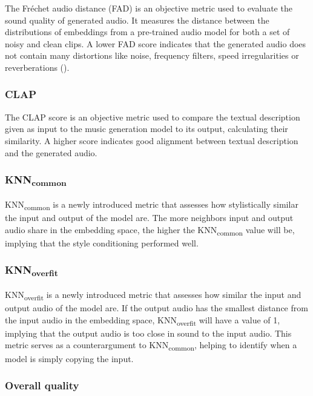 \documentclass[a4paper,12pt,twoside]{article}
\begin{document}
The Fréchet audio distance (FAD) is an objective metric used to evaluate the sound quality of generated audio. It measures the distance between the distributions of embeddings from a pre-trained audio model for both a set of noisy and clean clips. A lower FAD score indicates that the generated audio does not contain many distortions like noise, frequency filters, speed irregularities or reverberations (\cite{kilgourFrechetAudioDistance2019a}).

\subsubsection*{CLAP}\label{sec:CLAP}

The CLAP score is an objective metric used to compare the textual description given as input to the music generation model to its output, calculating their similarity. A higher score indicates good alignment between textual description and the generated audio.

\subsubsection*{KNN\textsubscript{common}}\label{sec:KNNcommon}

KNN\textsubscript{common} is a newly introduced metric that assesses how stylistically similar the input and output of the model are. The more neighbors input and output audio share in the embedding space, the higher the KNN\textsubscript{common} value will be, implying that the style conditioning performed well.

\subsubsection*{KNN\textsubscript{overfit}}\label{sec:KNNoverfit}

KNN\textsubscript{overfit} is a newly introduced metric that assesses how similar the input and output audio of the model are. If the output audio has the smallest distance from the input audio in the embedding space, KNN\textsubscript{overfit} will have a value of 1, implying that the output audio is too close in sound to the input audio. This metric serves as a counterargument to KNN\textsubscript{common}, helping to identify when a model is simply copying the input.

\subsubsection*{Overall quality}\label{sec:OVL}
\end{document}
